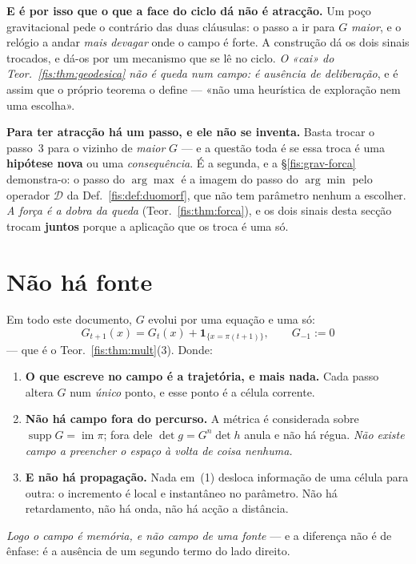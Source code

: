 \documentclass[livro.tex]{subfiles}
\begin{document}
\medskip\noindent\textbf{E é por isso que o que a face do ciclo dá não é
atracção.} Um poço
gravitacional pede o contrário das duas cláusulas: o passo a ir para $G$
\emph{maior}, e o relógio a andar \emph{mais devagar} onde o campo é forte. A
construção dá os dois sinais trocados, e dá-os por um mecanismo que se lê no
ciclo. \emph{O «cai» do Teor.~\ref{fis:thm:geodesica} não é queda num campo: é
ausência de deliberação}, e é assim que o próprio teorema o define --- «não uma
heurística de exploração nem uma escolha».

\medskip\noindent\textbf{Para ter atracção há um passo, e ele não se inventa.}
Basta trocar o passo~3 para o vizinho de \emph{maior} $G$ --- e a questão toda é
se essa troca é uma \textbf{hipótese nova} ou uma \emph{consequência}. É a
segunda, e a §\ref{fis:grav-forca} demonstra-o: o passo do $\arg\max$ é a imagem
do passo do $\arg\min$ pelo operador $\mathcal{D}$ da Def.~\ref{fis:def:duomorf},
que não tem parâmetro nenhum a escolher. \emph{A força é a dobra da queda}
(Teor.~\ref{fis:thm:forca}), e os dois sinais desta secção trocam \textbf{juntos}
porque a aplicação que os troca é uma só.

\section{Não há fonte}\label{fis:grav-semfonte}

\begin{teorema}\label{fis:thm:semfonte}
Em todo este documento, $G$ evolui por uma equação e uma só:
\[
\boxed{\;G_{t+1}(x)=G_t(x)+\mathbf{1}_{\{x=\pi(t+1)\}},\qquad G_{-1}:=0\;}
\]
--- que é o Teor.~\ref{fis:thm:mult}(3). Donde:
\begin{enumerate}\itemsep3pt
\item[(1)] \textbf{O que escreve no campo é a trajetória, e mais nada.} Cada
passo altera $G$ num \emph{único} ponto, e esse ponto é a célula corrente.
\item[(2)] \textbf{Não há campo fora do percurso.} A métrica é considerada sobre
$\operatorname{supp}G=\operatorname{im}\pi$; fora dele $\det g=G^{n}\det h$ anula
e não há régua. \emph{Não existe campo a preencher o espaço à volta de coisa
nenhuma.}
\item[(3)] \textbf{E não há propagação.} Nada em~(1) desloca informação de uma
célula para outra: o incremento é local e instantâneo no parâmetro. Não há
retardamento, não há onda, não há acção a distância.
\end{enumerate}
\emph{Logo o campo é memória, e não campo de uma fonte} --- e a diferença não é
de ênfase: é a ausência de um segundo termo do lado direito.
\end{teorema}
\end{document}
